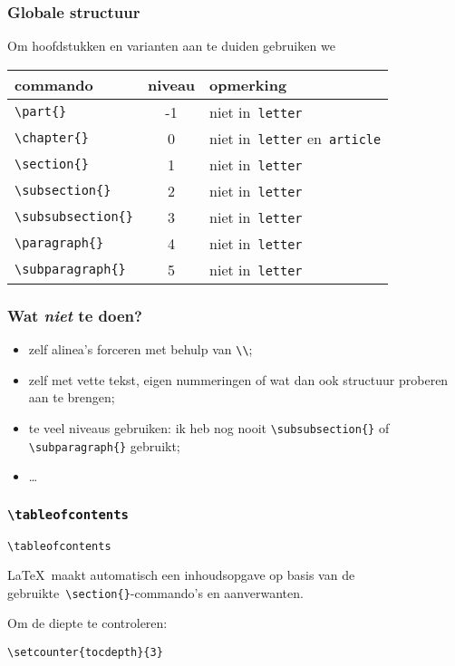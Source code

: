 \begin{frame}
  \frametitle{Globale structuur}

  Om hoofdstukken en varianten aan te duiden gebruiken we
  \begin{tabular}{lcl}
    commando & niveau & opmerking \\\midrule
    \texttt{\textcolor{uagreen}{\textbackslash part}\{\}} & -1 & niet in~\texttt{letter} \\
    \texttt{\textcolor{uagreen}{\textbackslash chapter}\{\}} & 0 & niet in~\texttt{letter} en~\texttt{article} \\
	  \texttt{\textcolor{uagreen}{\textbackslash section}\{\}} & 1 & niet in~\texttt{letter} \\
    \texttt{\textcolor{uagreen}{\textbackslash subsection}\{\}} & 2 & niet in~\texttt{letter} \\
    \texttt{\textcolor{uagreen}{\textbackslash subsubsection}\{\}} & 3 & niet in~\texttt{letter} \\
    \texttt{\textcolor{uagreen}{\textbackslash paragraph}\{\}} & 4 & niet in~\texttt{letter} \\
	  \texttt{\textcolor{uagreen}{\textbackslash subparagraph}\{\}} & 5 & niet in~\texttt{letter} \\
  \end{tabular}
\end{frame}

\begin{frame}[fragile]
  \frametitle{Wat \emph{niet} te doen?}

  \begin{itemize}
	  \item zelf alinea's forceren met behulp van \verb|\\|;
    \item zelf met vette tekst, eigen nummeringen of wat dan ook structuur proberen aan te brengen;
    \item te veel niveaus gebruiken: ik heb nog nooit \texttt{\textcolor{uagreen}{\textbackslash subsubsection}\{\}} of \texttt{\textcolor{uagreen}{\textbackslash subparagraph}\{\}} gebruikt;
    \item \ldots
  \end{itemize}
\end{frame}

\begin{frame}[fragile]
  \frametitle{\texttt{\textbackslash tableofcontents}}
  \begin{verbatim}
\tableofcontents
  \end{verbatim}
  \LaTeX~maakt automatisch een inhoudsopgave op basis van de gebruikte~\texttt{\textcolor{uagreen}{\textbackslash section}\{\}}-commando's en aanverwanten.
  
  Om de diepte te controleren:
  \begin{verbatim}
\setcounter{tocdepth}{3}
  \end{verbatim}
\end{frame}

